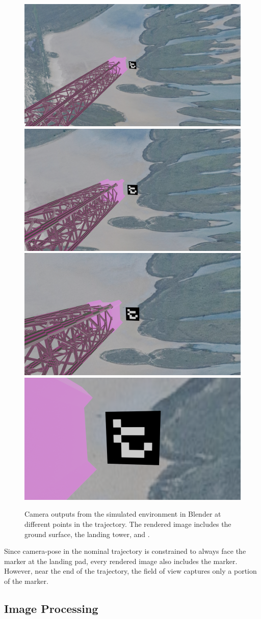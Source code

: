 \documentclass[conference]{IEEEtran}
\begin{document}
\begin{figure}[htbp] \label{fig:blender_images}
    \includegraphics[width=.243\textwidth]{blender_sim/simulation_imgs/0.png}\hfill
    \includegraphics[width=.243\textwidth]{blender_sim/simulation_imgs/30.png}\hfill
    \includegraphics[width=.243\textwidth]{blender_sim/simulation_imgs/40.png}\hfill
    \includegraphics[width=.243\textwidth]{blender_sim/simulation_imgs/60.png}
    \caption{Camera outputs from the simulated environment in Blender at different points in the trajectory. The rendered image includes the ground surface, the landing tower, and .}
\end{figure}

Since camera-pose in the nominal trajectory is constrained to always face the marker at the landing pad, every rendered image also includes the marker. However, near the end of the trajectory, the field of view captures only a portion of the marker.

\subsection{Image Processing} \label{sec:image_processing}
\end{document}
